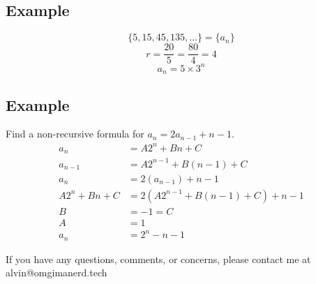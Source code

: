 \documentclass[letterpaper, 12pt]{math}
\begin{document}
\subsection*{Example}
\[ \{5,15,45,135,\dots\} = \{a_{n}\} \]
\[ r = \frac{20}{5} = \frac{80}{4} = 4 \]
\[ a_{n} = 5\times 3^{n} \]

\subsection*{Example}
Find a non-recursive formula for \( a_{n} = 2a_{n-1}+n-1 \).
\begin{align*}
  a_{n} &= A2^{n}+Bn+C \\
  a_{n-1} &= A2^{n-1}+B(n-1)+C \\
  a_{n} &= 2(a_{n-1})+n-1 \\
  A2^{n}+Bn+C &= 2(A2^{n-1}+B(n-1)+C)+n-1 \\
  B &= -1 = C \\
  A &= 1 \\
  a_{n} &= 2^{n}-n-1
\end{align*}

\begin{center}
  If you have any questions, comments, or concerns, please contact me at
  alvin@omgimanerd.tech
\end{center}
\end{document}
